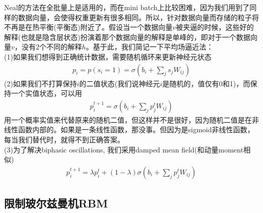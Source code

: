             \par
            Neal的方法在全批量上是适用的，而在mini batch上比较困难，因为我们用到了同样的数据向量，会使得权重更新有很多相同。所以，针对数据向量而存储的粒子将不再是在热平衡(平衡态)附近了。假设当一个数据向量$v$被夹逼的时候，这些好的解释(也就是隐含层状态)扮演着那个数据向量的解释是单峰的，即对于一个数据向量$v$，没有2个不同的解释$h$。基于此，我们简记一下平均场逼近法：\\
            (1)如果我们想得到正确统计数据，需要随机循环来更新神经元状态
            \begin{align*}
            p_i = p(s_i = 1) = \sigma\left(b_i + \sum_j s_j W_{ij}\right)
            \end{align*}
            (2)如果我们不打算保持$i$的二值状态(我们说神经元$i$是随机的，值仅有0和1)，而保持一个实值状态，可以用
            \begin{align*}
            p_i^{t+1} = \sigma\left(b_i + \sum_j p_j^t W_{ij}\right)
            \end{align*}
            用一个概率实值来代替原来的随机二值，但这样并不是很好，因为随机二值是在非线性函数内部的。如果是一条线性函数，那没事。但因为是sigmoid非线性函数，每当我们替代时，就得不到正确答案。\\
            (3)为了解决biphasic oscillations, 我们采用damped mean field(和动量moment相似)
            \begin{align*}
            p_i^{t+1} = \lambda p_i^t + (1-\lambda)\sigma\left(b_i + \sum_j p_j^t W_{ij}\right)
            \end{align*}

    \subsection{限制玻尔兹曼机RBM}
